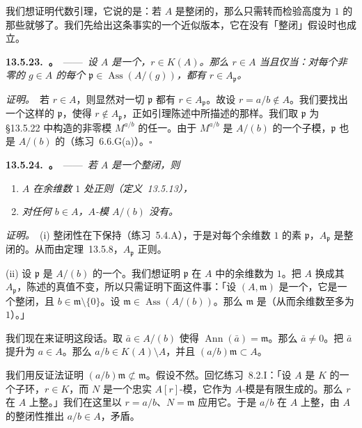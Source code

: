 我们想证明代数\trHartogs{}引理，它说的是：若 $A$ 是整闭的，那么只需转而检验高度为 $1$ 的那些\trPrimeIdeal{}就够了。我们先给出这条事实的一个近似版本，它在没有「整闭」假设时也成立。

\textbf{13.5.23.\ \trhLemma{}。}\ ——\ \emph{设 $A$ 是一个\trNoetherian\trIntegralDomain，$r\in K(A)$。那么 $r\in A$ 当且仅当：对每个非零的 $g\in A$ 的每个\trPrimeIdeal{} $\mathfrak{p}\in\operatorname{Ass}(A/(g))$，都有 $r\in A_{\mathfrak{p}}$。}

\emph{证明。}\ 若 $r\in A$，则显然对一切 $\mathfrak{p}$ 都有 $r\in A_{\mathfrak{p}}$。故设 $r=a/b\notin A$。我们要找出一个这样的 $\mathfrak{p}$，使得 $r\notin A_{\mathfrak{p}}$，正如引理陈述中所描述的那样。我们取 $\mathfrak{p}$ 为 \S13.5.22 中构造的非零模 $M^{a/b}$ 的任一\trAssociatedPrimeIdeal。由于 $M^{a/b}$ 是 $A/(b)$ 的一个子模，$\mathfrak{p}$ 也是 $A/(b)$ 的\trAssociatedPrimeIdeal（\mbox{练习~6.6.G(a)}）。\hfill$\square$

\textbf{13.5.24.\ \trhProposition{}。}\ ——\ \emph{若 $A$ 是一个\trNoetherian{}整闭\trIntegralDomain，则}
\begin{enumerate}[label=(\roman*)]
\item \emph{$A$ 在余维数 $1$ 处正则（定义~13.5.13），}
\item \emph{对任何 $b\in A$，$A$-模 $A/(b)$ 没有\trEmbeddedPoint。}
\end{enumerate}

\emph{证明。}\ (i) 整闭性在\trLocalization{}下保持（\mbox{练习~5.4.A}），于是对每个余维数 $1$ 的素 $\mathfrak{p}$，$A_{\mathfrak{p}}$ 是整闭的。从而由定理~13.5.8，$A_{\mathfrak{p}}$ 正则。

(ii) 设 $\mathfrak{p}$ 是 $A/(b)$ 的一个\trAssociatedPrimeIdeal。我们想证明 $\mathfrak{p}$ 在 $A$ 中的余维数为 $1$。把 $A$ 换成其\trLocalization{} $A_{\mathfrak{p}}$，陈述的真值不变，所以只需证明下面这件事：「设 $(A,\mathfrak{m})$ 是一个\trNoetherian\trLocalRing，它是一个整闭\trIntegralDomain，且 $b\in\mathfrak{m}\setminus\{0\}$。设 $\mathfrak{m}\in\operatorname{Ass}(A/(b))$。那么 $\mathfrak{m}$ 是\trPrincipalIdeal（从而余维数至多为 $1$）。」

我们现在来证明这段话。取 $\bar{a}\in A/(b)$ 使得 $\operatorname{Ann}(\bar{a})=\mathfrak{m}$。那么 $\bar{a}\neq0$。把 $\bar{a}$ 提升为 $a\in A$。那么 $a/b\in K(A)\setminus A$，并且 $(a/b)\mathfrak{m}\subset A$。

我们用反证法证明 $(a/b)\mathfrak{m}\not\subset\mathfrak{m}$。假设不然。回忆\mbox{练习~8.2.I}：「设 $A$ 是 $K$ 的一个子环，$r\in K$，而 $N$ 是一个忠实 $A[r]$-模，它作为 $A$-模是有限生成的。那么 $r$ 在 $A$ 上整。」我们在这里以 $r=a/b$、$N=\mathfrak{m}$ 应用它。于是 $a/b$ 在 $A$ 上整，由 $A$ 的整闭性推出 $a/b\in A$，矛盾。

